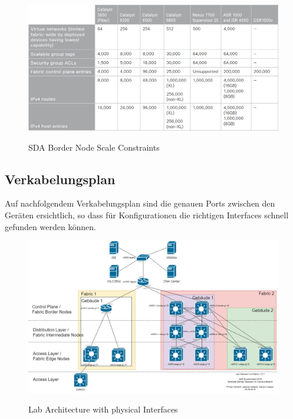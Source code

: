 \begin{figure}[H]
	\centering
	\includegraphics[width=1\linewidth]{img/MaximumScale-BorderNode.png}\\[1px]
	\caption{SDA Border Node Scale Constraints \cite{sda-designguide}}
	\label{fig:SDA Border Node Scale Constraints}
\end{figure}

\pagebreak
\subsection{Verkabelungsplan}
Auf nachfolgendem Verkabelungsplan sind die genauen Ports zwischen den Geräten ersichtlich, so dass für Konfigurationen die richtigen Interfaces schnell gefunden werden können.
\begin{figure}[H]
	\centering
	\includegraphics[angle=90,width=0.9\linewidth]{img/LabNetworkArchitecture-Interfaces.png}\\[1px]
	\caption{Lab Architecture with physical Interfaces}
	\label{fig:Lab Architecture with physical Interfaces}
\end{figure}


